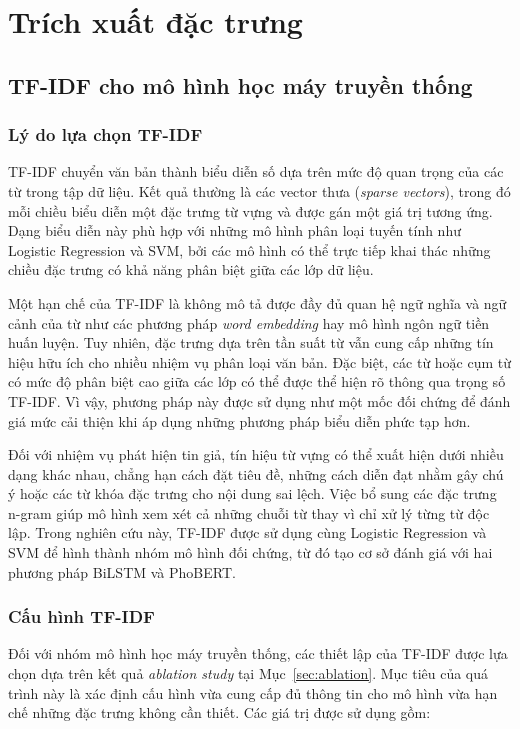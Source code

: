 \section{Trích xuất đặc trưng}

\subsection{TF-IDF cho mô hình học máy truyền thống}

\subsubsection{Lý do lựa chọn TF-IDF}

TF-IDF chuyển văn bản thành biểu diễn số dựa trên mức độ quan trọng của các từ trong tập dữ liệu. Kết quả thường là các vector thưa (\textit{sparse vectors}), trong đó mỗi chiều biểu diễn một đặc trưng từ vựng và được gán một giá trị tương ứng. Dạng biểu diễn này phù hợp với những mô hình phân loại tuyến tính như Logistic Regression và SVM, bởi các mô hình có thể trực tiếp khai thác những chiều đặc trưng có khả năng phân biệt giữa các lớp dữ liệu.

Một hạn chế của TF-IDF là không mô tả được đầy đủ quan hệ ngữ nghĩa và ngữ cảnh của từ như các phương pháp \textit{word embedding} hay mô hình ngôn ngữ tiền huấn luyện. Tuy nhiên, đặc trưng dựa trên tần suất từ vẫn cung cấp những tín hiệu hữu ích cho nhiều nhiệm vụ phân loại văn bản. Đặc biệt, các từ hoặc cụm từ có mức độ phân biệt cao giữa các lớp có thể được thể hiện rõ thông qua trọng số TF-IDF. Vì vậy, phương pháp này được sử dụng như một mốc đối chứng để đánh giá mức cải thiện khi áp dụng những phương pháp biểu diễn phức tạp hơn.

Đối với nhiệm vụ phát hiện tin giả, tín hiệu từ vựng có thể xuất hiện dưới nhiều dạng khác nhau, chẳng hạn cách đặt tiêu đề, những cách diễn đạt nhằm gây chú ý hoặc các từ khóa đặc trưng cho nội dung sai lệch. Việc bổ sung các đặc trưng n-gram giúp mô hình xem xét cả những chuỗi từ thay vì chỉ xử lý từng từ độc lập. Trong nghiên cứu này, TF-IDF được sử dụng cùng Logistic Regression và SVM để hình thành nhóm mô hình đối chứng, từ đó tạo cơ sở đánh giá với hai phương pháp BiLSTM và PhoBERT.

\subsubsection{Cấu hình TF-IDF}
Đối với nhóm mô hình học máy truyền thống, các thiết lập của TF-IDF được lựa chọn dựa trên kết quả \textit{ablation study} tại Mục~\ref{sec:ablation}. Mục tiêu của quá trình này là xác định cấu hình vừa cung cấp đủ thông tin cho mô hình vừa hạn chế những đặc trưng không cần thiết. Các giá trị được sử dụng gồm:

